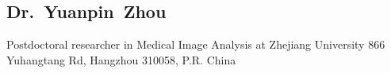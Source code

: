 \documentclass[11pt,a4paper, final]{moderncv}
\newcommand{\spacesubsection}{\vspace{0.2cm}}
\begin{document}
	\subsection{Dr.~Yuanpin~Zhou}
		\cvline{}
		{Postdoctoral researcher in Medical Image Analysis at Zhejiang University}
		{866 Yuhangtang Rd, Hangzhou 310058, P.R. China}





\clearpage
\end{document}
